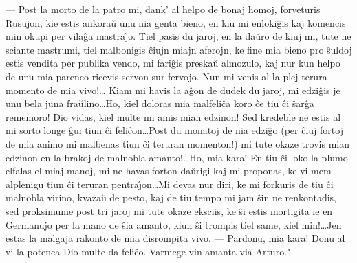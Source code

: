 --- Post la morto de la patro mi, dank' al helpo de bonaj homoj,
forveturis Rusujon, kie estis ankora\u u unu nia genta bieno, en kiu
mi enloki\^gis kaj komencis min okupi per vila\^ga mastra\^{\j}o.
Tiel pasis du jaroj, en la da\u uro de kiuj mi, tute ne sciante
mastrumi, tiel malbonigis \^ciujn miajn aferojn, ke fine mia bieno
pro \^suldoj estis vendita per publika vendo, mi fari\^gis preska\u
u almozulo, kaj nur kun helpo de unu mia parenco ricevis servon sur
fervojo. Nun mi venis al la plej terura momento de mia vivo!\dots
Kiam mi havis la a\^gon de dudek du jaroj, mi edzi\^gis je unu bela
juna fra\u ulino\dots Ho, kiel doloras mia malfeli\^ca koro \^ce tiu
\^ci \^sar\^ga rememoro! Dio vidas, kiel multe mi amis mian edzinon!
Sed kredeble ne estis al mi sorto longe \^gui tiun \^ci
feli\^con\dots Post du monatoj de nia edzi\^go (per \^ciuj fortoj de
mia animo mi malbenas tiun \^ci teruran momenton!) mi tute okaze
trovis mian edzinon en la brakoj de malnobla amanto!\dots Ho, mia
kara! En tiu \^ci loko la plumo elfalas el miaj manoj, mi ne havas
forton da\u urigi kaj mi proponas, ke vi mem alplenigu tiun \^ci
teruran pentra\^{\j}on\dots Mi devas nur diri, ke mi forkuris de tiu
\^ci malnobla virino, kvaza\u u de pesto, kaj de tiu tempo mi jam
\^sin ne renkontadis, sed proksimume post tri jaroj mi tute okaze
eksciis, ke \^si estis mortigita ie en Germanujo per la mano de
\^sia amanto, kiun \^si trompis tiel same, kiel min!\dots Jen estas
la malgaja rakonto de mia disrompita vivo. --- Pardonu, mia kara!
Donu al vi la potenca Dio multe da feli\^co. Varmege vin amanta via
Arturo."

